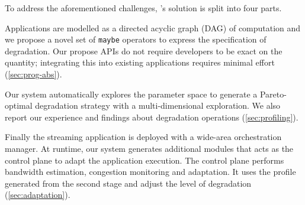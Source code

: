 To address the aforementioned challenges, \sysname{}'s solution is split into
four parts.

 Applications are modelled as a directed acyclic
graph (DAG) of computation and we propose a novel set of \texttt{maybe}
operators to express the specification of degradation. Our propose APIs do not
require developers to be exact on the quantity; integrating this into existing
applications requires minimal effort (\autoref{sec:prog-abs}).

 Our system automatically explores
the parameter space to generate a Pareto-optimal degradation strategy with a
multi-dimensional exploration. We also report our experience and findings about
degradation operations (\autoref{sec:profiling}).

 Finally the streaming application is deployed with a
wide-area orchestration manager. At runtime, our system generates additional
modules that acts as the control plane to adapt the application execution. The
control plane performs bandwidth estimation, congestion monitoring and
adaptation. It uses the profile generated from the second stage and adjust the
level of degradation (\autoref{sec:adaptation}).


